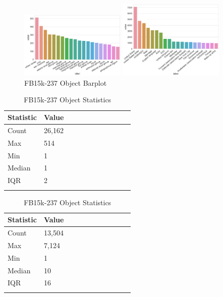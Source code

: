 
\begin{figure}[H]
	\parbox{.5\linewidth}{
   		\centering
    		\includegraphics[width=0.45\textwidth, height=0.2\textheight]{WN18RR_Object_Counts}
		\caption{WN18RR Object Barplot}
		}
	\hfill
	\parbox{.5\linewidth}{
   		\centering
		\includegraphics[width=0.45\textwidth, height=0.2\textheight]{FB15k-237_Object_Counts}
		\caption{FB15k-237 Object Barplot}
		}
\end{figure}


\begin{table}[H]
	\parbox{.5\linewidth}{
		\centering
		\begin{tabular}{lllllllllll}
  			\textbf{Statistic} & \textbf{Value}  \\
  			\hline
			Count & 26,162 \\
			Max & 514 \\
			Min & 1 \\
  			Median & 1 \\
  			IQR & 2 \\
			&
		\end{tabular}
		\caption{WN18RR Object Statistics}
		}
	\hfill
	\parbox{.5\linewidth}{
		\centering
		\begin{tabular}{lllllllllll}
  			\textbf{Statistic} & \textbf{Value}  \\
  			\hline
			Count & 13,504 \\
			Max & 7,124 \\
			Min & 1 \\
  			Median & 10 \\
  			IQR & 16 \\
			&
		\end{tabular}
		\caption{FB15k-237 Object Statistics}
		}
\end{table}

